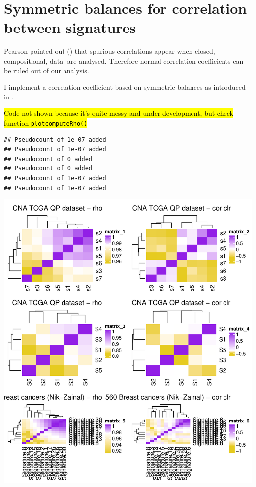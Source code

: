 \documentclass{article}\usepackage[]{graphicx}\usepackage[]{color}
\makeatletter
\def\maxwidth{ %
  \ifdim\Gin@nat@width>\linewidth
    \linewidth
  \else
    \Gin@nat@width
  \fi
}
\newenvironment{kframe}{%
 \def\at@end@of@kframe{}%
 \ifinner\ifhmode%
  \def\at@end@of@kframe{\end{minipage}}%
  \begin{minipage}{\columnwidth}%
 \fi\fi%
 \def\FrameCommand##1{\hskip\@totalleftmargin \hskip-\fboxsep
 \colorbox{shadecolor}{##1}\hskip-\fboxsep
     \hskip-\linewidth \hskip-\@totalleftmargin \hskip\columnwidth}%
 \MakeFramed {\advance\hsize-\width
   \@totalleftmargin\z@ \linewidth\hsize
   \@setminipage}}%
 {\par\unskip\endMakeFramed%
 \at@end@of@kframe}
\newenvironment{knitrout}{}{} %
\makeatother
\begin{document}
\clearpage
\section{Symmetric balances for correlation between signatures}
Pearson pointed out (\cite{pearson1897mathematical}) that spurious correlations appear when closed, compositional, data, are analysed. Therefore normal correlation coefficients can be ruled out of our analysis.

I implement a correlation coefficient based on symmetric balances as introduced in \cite{kynvclova2017correlation}.

\begin{center}
\hl{Code not shown because it's quite messy and under development, but check function \texttt{plotcomputeRho()}}
\end{center}

\begin{knitrout}
\color{fgcolor}\begin{kframe}
\begin{verbatim}
## Pseudocount of 1e-07 added
## Pseudocount of 1e-07 added
## Pseudocount of 0 added
## Pseudocount of 0 added
## Pseudocount of 1e-07 added
## Pseudocount of 1e-07 added
\end{verbatim}
\end{kframe}
\includegraphics[width=\maxwidth]{figure/symmetric_balances_cor-1} 

\end{knitrout}
\clearpage
\end{document}

